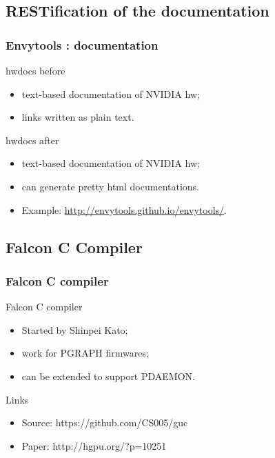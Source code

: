 \documentclass[11pt,english,compress]{beamer}
\begin{document}
\subsection{RESTification of the documentation}
\begin{frame}
	\frametitle{Envytools : documentation}

	\begin{block}{hwdocs before}
		\begin{itemize}
			\item text-based documentation of NVIDIA hw;
			\item links written as plain text.
		\end{itemize}
	\end{block}

	\begin{block}{hwdocs after}
		\begin{itemize}
			\item text-based documentation of NVIDIA hw;
			\item can generate pretty html documentations.
			\item Example: \url{http://envytools.github.io/envytools/}.
		\end{itemize}
	\end{block}
\end{frame}

\subsection{Falcon C Compiler}
\begin{frame}
	\frametitle{Falcon C compiler}

	\begin{block}{Falcon C compiler}
		\begin{itemize}
			\item Started by Shinpei Kato;
			\item work for PGRAPH firmwares;
			\item can be extended to support PDAEMON.
		\end{itemize}
	\end{block}

	\begin{block}{Links}
		\begin{itemize}
			\item Source: https://github.com/CS005/guc
			\item Paper: http://hgpu.org/?p=10251
		\end{itemize}
	\end{block}
\end{frame}
\end{document}
